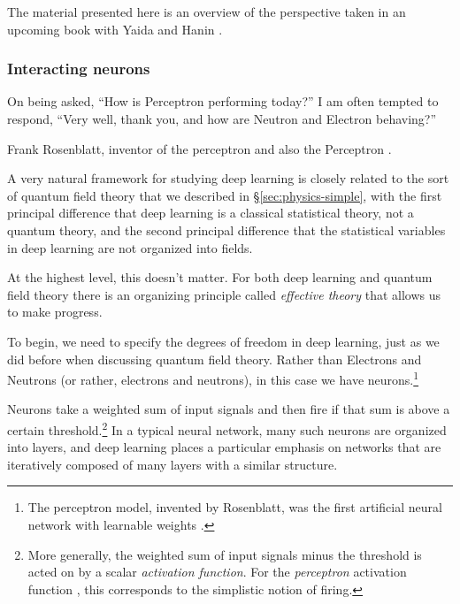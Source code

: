 \documentclass[12pt]{article}
\begin{document}
The material presented here is an overview of the perspective taken in an upcoming book with Yaida and Hanin \cite{Principles}.























\subsubsection*{Interacting neurons}\label{sec:EFT}

\epigraph{On being asked, ``How is Perceptron performing today?'' I am often tempted to respond, ``Very well, thank you, and how are Neutron and Electron behaving?''}{Frank Rosenblatt, inventor of the perceptron and also the Perceptron  \cite{rosenblatt1961principles}.}

\noindent{}A very natural framework for studying deep learning is closely related to the sort of quantum field theory that we described in \S\ref{sec:physics-simple}, with the first principal difference that deep learning is a classical statistical theory, not a quantum theory, and the second principal difference that the statistical variables in deep learning are not organized into fields. 

At the highest level, this doesn't matter. For both deep learning and quantum field theory there is an organizing principle called \emph{effective theory} that allows us to make progress.

To begin, we need to specify the degrees of freedom in deep learning, just as we did before when discussing quantum field theory. Rather than Electrons and Neutrons (or rather, electrons and neutrons), in this case we have neurons.\footnote{
    The perceptron model, invented by Rosenblatt, was the first artificial neural network with learnable weights \cite{rosenblatt1958perceptron}.
} 

Neurons take a weighted sum of input signals and then fire if that sum is above a certain threshold.\footnote{
    More generally, the weighted sum of input signals minus the threshold is acted on by a scalar \emph{activation function}. For the \emph{perceptron} activation function \cite{mcculloch1943logical}, this corresponds to the simplistic notion of firing.
} In a typical neural network, many such neurons are organized into layers, and deep learning places a particular emphasis on networks that are iteratively composed of many layers with a similar structure. 
\end{document}
